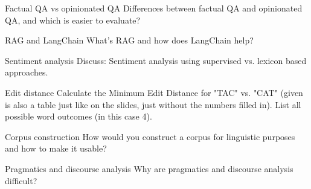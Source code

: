 \documentclass{article}
\begin{document}
\begin{exercise}{Factual QA vs opinionated QA}
  Differences between factual QA and opinionated QA, and which is easier to evaluate?

  \begin{solution}
  \end{solution}
\end{exercise}

\begin{exercise}{RAG and LangChain}
  What's RAG and how does LangChain help?

  \begin{solution}
  \end{solution}
\end{exercise}

\begin{exercise}{Sentiment analysis}
  Discuss: Sentiment analysis using supervised vs. lexicon based approaches.

  \begin{solution}
  \end{solution}
\end{exercise}

\begin{exercise}{Edit distance}
  Calculate the Minimum Edit Distance for "TAC" vs. "CAT" (given is also a table just like on the slides, just without the numbers filled in). List all possible word outcomes (in this case 4).

  \begin{solution}
  \end{solution}
\end{exercise}


\setcounter{section}{2021}

\begin{exercise}{Corpus construction}
  How would you construct a corpus for linguistic purposes and how to make it usable?

  \begin{solution}
  \end{solution}
\end{exercise}

\begin{exercise}{Pragmatics and discourse analysis}
  Why are pragmatics and discourse analysis difficult?

  \begin{solution}
  \end{solution}
\end{exercise}
\end{document}
